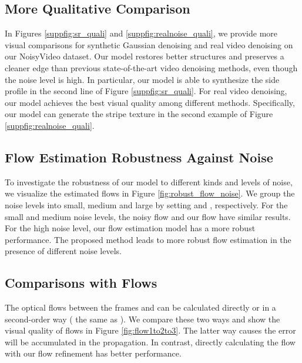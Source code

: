 \documentclass[10pt,twocolumn,letterpaper]{article}
\newlength \g
\begin{document}
\begin{figure*}[t]
{\begin{tabular}{cc}
\end{tabular}
	}
\caption{Visual comparison of different methods on our proposed RealNoise dataset.} 
\label{suppfig:realnoise_quali}
\end{figure*}


\subsection{More Qualitative Comparison}
In Figures \ref{suppfig:sr_quali} and \ref{suppfig:realnoise_quali}, we provide more visual comparisons for synthetic Gaussian denoising and real video denoising on our NoisyVideo dataset. Our model restores better structures and preserves a cleaner edge than previous state-of-the-art video denoising methods, even though the noise level is high. 
In particular, our model is able to synthesize the side profile in the second line of Figure \ref{suppfig:sr_quali}.
For real video denoising, our model achieves the best visual quality among different methods.
Specifically, our model can generate the stripe texture in the second example of Figure \ref{suppfig:realnoise_quali}.



\subsection{Flow Estimation Robustness Against Noise}\label{subsec:noise}
To investigate the robustness of our model to different kinds and levels of noise, we visualize the estimated flows in Figure \ref{fig:robust_flow_noise}.
We group the noise levels into small, medium and large by setting  and , respectively.
For the small and medium noise levels, the noisy flow and our flow have similar results.
For the high noise level, our flow estimation model has a more robust performance.
The proposed method leads to more robust flow estimation in the presence of different noise levels.


\subsection{Comparisons with Flows} \label{sec:flow}

The optical flows between the frames  and  can be calculated directly or in a second-order way ( the same as \cite{chan2021basicvsrpp}).
We compare these two ways and show the visual quality of flows in Figure \ref{fig:flow1to2to3}.
The latter way causes the error will be accumulated in the propagation.
In contrast, directly calculating the flow with our flow refinement has better performance.
\end{document}

